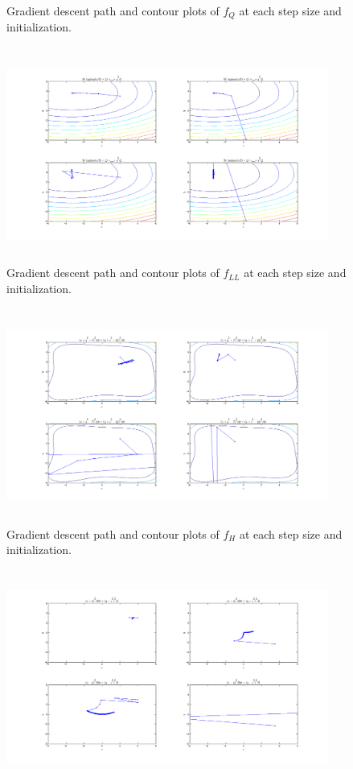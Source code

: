 \documentclass[11pt]{article}
\begin{document}
\begin{enumerate}[(a)]
\begin{figure}[h!]
\begin{center}
\end{center}
\caption{Gradient descent path and contour plots of $f_Q$ at each step size and
initialization.}
\label{fig:grad1}
\end{figure}
\begin{figure}[h!]
\begin{center}
\includegraphics[width=300pt,height=200pt]{fig3b2}
\end{center}
\caption{Gradient descent path and contour plots of $f_{LL}$ at each step size
and initialization.}
\label{fig:grad2}
\end{figure}
\begin{figure}[h!]
\begin{center}
\includegraphics[width=300pt,height=200pt]{fig3b3}
\end{center}
\caption{Gradient descent path and contour plots of $f_H$ at each step size and
initialization.}
\label{fig:grad3}
\end{figure}
\begin{figure}[h!]
\begin{center}
\includegraphics[width=300pt,height=200pt]{fig3b4}

\end{center}
\end{figure}
\end{enumerate}
\end{document}
